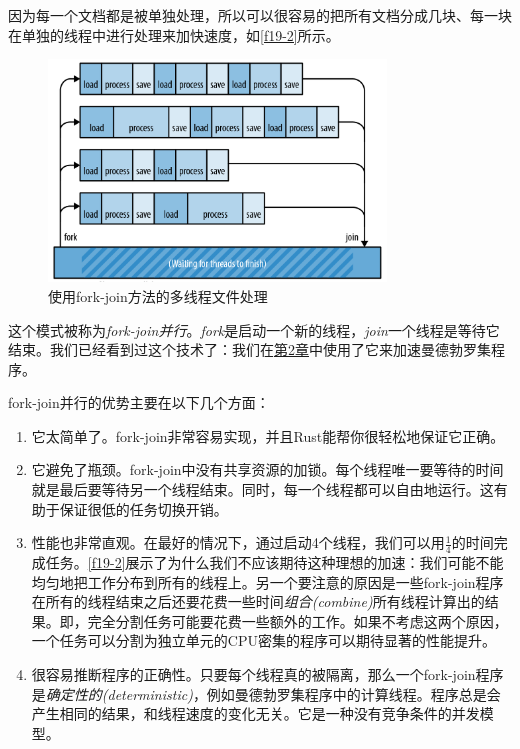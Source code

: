因为每一个文档都是被单独处理，所以可以很容易的把所有文档分成几块、每一块在单独的线程中进行处理来加快速度，如\autoref{f19-2}所示。

\begin{figure}[htbp]
    \centering
    \includegraphics[width=0.8\textwidth]{../img/f19-2.png}
    \caption{使用fork-join方法的多线程文件处理}
    \label{f19-2}
\end{figure}

这个模式被称为\emph{fork-join并行}。\emph{fork}是启动一个新的线程，\emph{join}一个线程是等待它结束。我们已经看到过这个技术了：我们在\hyperref[ch02]{第2章}中使用了它来加速曼德勃罗集程序。

fork-join并行的优势主要在以下几个方面：
\begin{enumerate}
    \item 它太简单了。fork-join非常容易实现，并且Rust能帮你很轻松地保证它正确。
    \item 它避免了瓶颈。fork-join中没有共享资源的加锁。每个线程唯一要等待的时间就是最后要等待另一个线程结束。同时，每一个线程都可以自由地运行。这有助于保证很低的任务切换开销。
    \item 性能也非常直观。在最好的情况下，通过启动4个线程，我们可以用$\frac{1}{4}$的时间完成任务。\autoref{f19-2}展示了为什么我们不应该期待这种理想的加速：我们可能不能均匀地把工作分布到所有的线程上。另一个要注意的原因是一些fork-join程序在所有的线程结束之后还要花费一些时间\emph{组合(combine)}所有线程计算出的结果。即，完全分割任务可能要花费一些额外的工作。如果不考虑这两个原因，一个任务可以分割为独立单元的CPU密集的程序可以期待显著的性能提升。
    \item 很容易推断程序的正确性。只要每个线程真的被隔离，那么一个fork-join程序是\emph{确定性的(deterministic)}，例如曼德勃罗集程序中的计算线程。程序总是会产生相同的结果，和线程速度的变化无关。它是一种没有竞争条件的并发模型。
\end{enumerate}

